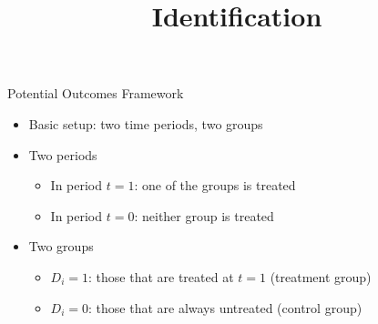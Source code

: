 \documentclass[dvipsnames,hyperref={pdfpagelabels=false}]{beamer}
\begin{document}
\title[]  
{Identification}


\author 
{}

\institute{}






\date
{}


\begin{frame}{}
	\titlepage
\end{frame}




\begin{frame}{Potential Outcomes Framework}{}
\begin{itemize}



\item Basic setup: two time periods, two groups
\vspace{0.2cm}
\item Two periods
\vspace{0.2cm}
\begin{itemize}
\item In period $t=1$: one of the groups is treated
\vspace{0.2cm}
\item In period $t=0$: neither group is treated
\vspace{0.2cm}
\end{itemize}
\item Two groups
\vspace{0.2cm}
\begin{itemize}
\item $D_i=1$: those that are treated at $t=1$ (treatment group)
\vspace{0.2cm}
\item $D_i=0$: those that are always untreated (control group)
\end{itemize}

\end{itemize}
\end{frame}
\end{document}
